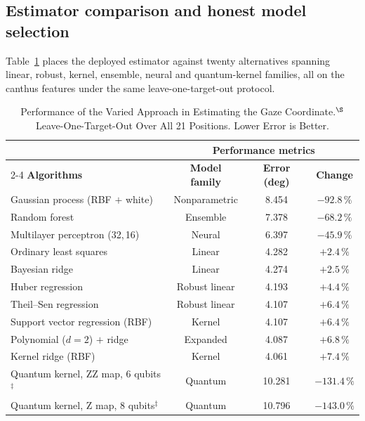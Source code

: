 \documentclass[conference]{IEEEtran}
\begin{document}
\subsection{Estimator comparison and honest model selection}
\label{sec:estimators}

Table~\ref{tab:gazealgos} places the deployed estimator against twenty
alternatives spanning linear, robust, kernel, ensemble, neural and
quantum-kernel families, all on the canthus features under the same
leave-one-target-out protocol.

\begin{table}[!tb]
\renewcommand{\arraystretch}{1.25}
\caption{Performance of the Varied Approach in Estimating the Gaze
Coordinate.$^{\S}$ Leave-One-Target-Out Over All 21 Positions. Lower Error is
Better.}
\label{tab:gazealgos}
\centering
\footnotesize
\begin{tabular}{@{}lccc@{}}
\toprule
 & \multicolumn{3}{c}{\textbf{Performance metrics}} \\
\cmidrule(l){2-4}
\textbf{Algorithms} & \textbf{Model family} & \textbf{Error (deg)} &
\textbf{Change} \\
\midrule
Gaussian process (RBF $+$ white)   & Nonparametric & 8.454 & $-92.8\,\%$ \\
Random forest                      & Ensemble      & 7.378 & $-68.2\,\%$ \\
Multilayer perceptron (32,\,16)    & Neural        & 6.397 & $-45.9\,\%$ \\
Ordinary least squares             & Linear        & 4.282 & $+2.4\,\%$ \\
Bayesian ridge                     & Linear        & 4.274 & $+2.5\,\%$ \\
Huber regression                   & Robust linear & 4.193 & $+4.4\,\%$ \\
Theil--Sen regression              & Robust linear & 4.107 & $+6.4\,\%$ \\
Support vector regression (RBF)    & Kernel        & 4.107 & $+6.4\,\%$ \\
Polynomial ($d=2$) $+$ ridge       & Expanded      & 4.087 & $+6.8\,\%$ \\
Kernel ridge (RBF)                 & Kernel        & 4.061 & $+7.4\,\%$ \\
\midrule
Quantum kernel, ZZ map, 6 qubits$^{\ddagger}$ & Quantum & 10.281 & $-131.4\,\%$ \\
Quantum kernel, Z map, 8 qubits$^{\ddagger}$  & Quantum & 10.796 & $-143.0\,\%$ \\

\end{tabular}
\end{table}
\end{document}
